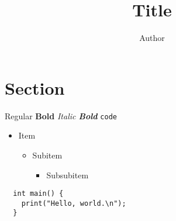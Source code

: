 \documentclass[a4paper]{jsarticle}
\title{
  {\Huge Title}
}
\author{
  Author
}
\begin{document}
\maketitle

\section{Section}
Regular \textbf{Bold}
\textit{Italic \textbf{Bold}}
\texttt{code}

\begin{itemize}
\item Item
  \begin{itemize}
  \item Subitem
    \begin{itemize}
    \item Subsubitem
    \end{itemize}
  \end{itemize}
\end{itemize}
\begin{lstlisting}
  int main() {
    print("Hello, world.\n");
  }
\end{lstlisting}
\end{document}
